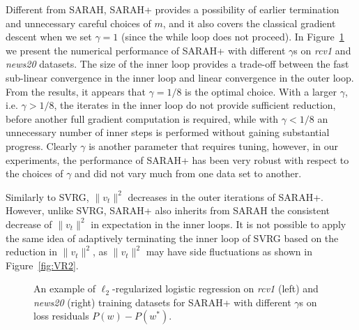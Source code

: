 \documentclass{article}
\newcommand{\new}[1]{\textcolor{red}{#1}}
\begin{document}
Different from SARAH, SARAH+ provides a possibility of earlier termination and unnecessary careful choices of $m$, and it also covers the classical gradient descent when we set $\gamma = 1$ (since the while loop does not proceed). In Figure~\ref{fig:SARAHplus} we  present the numerical performance of  SARAH+ with different $\gamma$s on \emph{rcv1} and \emph{news20} datasets. The size of the inner loop provides a trade-off between the fast sub-linear convergence in the inner loop and linear convergence in the outer loop. From the results, it appears that $\gamma=1/8$ is the optimal choice. With a larger $\gamma$, i.e. $\gamma > 1/8$, the iterates in the inner loop do not provide sufficient reduction, before another full gradient computation is required, while with  $\gamma < 1/8$
 an unnecessary number of inner steps is performed without gaining substantial progress. Clearly $\gamma$ is another parameter that requires tuning, however, in our experiments, the performance of SARAH+ has been very robust with respect to the choices of $\gamma$ and did not vary much from one data set to another. 
 

Similarly to SVRG, $\|v_t\|^2$ decreases in the outer iterations of SARAH+. However, unlike SVRG, SARAH+ also inherits from SARAH the consistent decrease of $\|v_t\|^2$ in expectation in the inner loops. It is not possible to apply the same idea of adaptively terminating the inner loop of SVRG based on the reduction in $\|v_t\|^2$, as $\|v_t\|^2$ may have side fluctuations as shown in Figure~\ref{fig:VR2}.

  \begin{figure} 
    \caption{\footnotesize An example of $\ell_2$-regularized logistic regression on \emph{rcv1} (left) and \emph{news20} (right) training datasets for SARAH+ with different $\gamma$s on loss residuals $P(w)-P(w^*)$.}
  \label{fig:SARAHplus}
 \end{figure}
 
\end{document}
